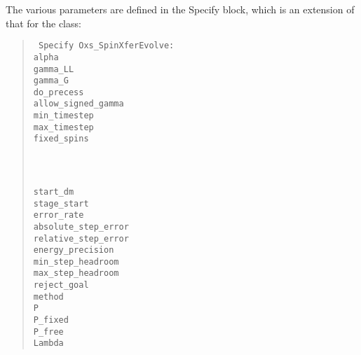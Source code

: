 \begin{description}
The various parameters are defined in the Specify block, which is an
extension of that for the
 class:
   \begin{latexonly}
   \begin{quote}\tt
   Specify Oxs\_SpinXferEvolve: \ocb\\
    \bi alpha                  \oxsval{$\alpha$}\\
    \bi gamma\_LL              \oxsval{$\bar{\gamma}$}\\
    \bi gamma\_G               \oxsval{$\gamma$}\\
    \bi do\_precess            \\
    \bi allow\_signed\_gamma \\
    \bi min\_timestep          \\
    \bi max\_timestep          \\
    \bi fixed\_spins \ocb\\
    \bi\bi {}\\
    \bi\bi  {}\\
    \bi\ccb\\
    \bi start\_dm              \oxsval{$\Delta \vm$}\\
    \bi stage\_start           \\
    \bi error\_rate            \\
    \bi absolute\_step\_error  \\
    \bi relative\_step\_error  \\
    \bi energy\_precision      \\
    \bi min\_step\_headroom    \\
    \bi max\_step\_headroom    \\
    \bi reject\_goal           \\
    \bi method                 \\
    \bi P                      \\
    \bi P\_fixed               \\
    \bi P\_free                \\
    \bi Lambda                 \oxsval{$\Lambda$}\\

\end{quote}
\end{latexonly}
\end{description}
